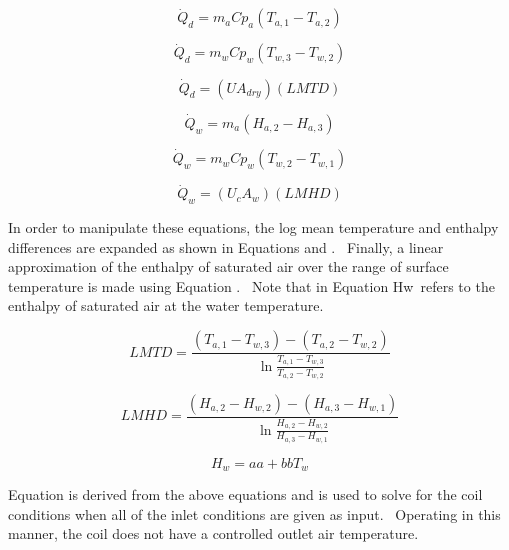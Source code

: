 \begin{equation}
{\dot Q_d} = {m_a}C{p_a}\left( {{T_{a,1}} - {T_{a,2}}} \right)
\end{equation}

\begin{equation}
{\dot Q_d} = {m_w}C{p_w}\left( {{T_{w,3}} - {T_{w,2}}} \right)
\end{equation}

\begin{equation}
{\dot Q_d} = \left( {U{A_{dry}}} \right)\left( {LMTD} \right)
\end{equation}

\begin{equation}
{\dot Q_w} = {m_a}\left( {{H_{a,2}} - {H_{a,3}}} \right)
\end{equation}

\begin{equation}
{\dot Q_w} = {m_w}C{p_w}\left( {{T_{w,2}} - {T_{w,1}}} \right)
\end{equation}

\begin{equation}
{\dot Q_w} = \left( {{U_c}{A_w}} \right)\left( {LMHD} \right)
\end{equation}

In order to manipulate these equations, the log mean temperature and enthalpy differences are expanded as shown in Equations and .~ Finally, a linear approximation of the enthalpy of saturated air over the range of surface temperature is made using Equation .~ Note that in Equation Hw~refers to the enthalpy of saturated air at the water temperature.

\begin{equation}
LMTD = \frac{{\left( {{T_{a,1}} - {T_{w,3}}} \right) - \left( {{T_{a,2}} - {T_{w,2}}} \right)}}{{\ln \frac{{{T_{a,1}} - {T_{w,3}}}}{{{T_{a,2}} - {T_{w,2}}}}}}
\end{equation}

\begin{equation}
LMHD = \frac{{\left( {{H_{a,2}} - {H_{w,2}}} \right) - \left( {{H_{a,3}} - {H_{w,1}}} \right)}}{{\ln \frac{{{H_{a,2}} - {H_{w,2}}}}{{{H_{a,3}} - {H_{w,1}}}}}}
\end{equation}

\begin{equation}
{H_w} = aa + bb {T_w}
\end{equation}

Equation is derived from the above equations and is used to solve for the coil conditions when all of the inlet conditions are given as input.~ Operating in this manner, the coil does not have a controlled outlet air temperature.

